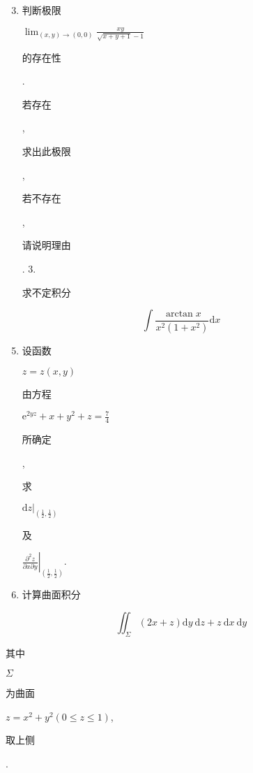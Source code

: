 \documentclass[10pt]{article}
\begin{document}
\begin{enumerate}
  \setcounter{enumi}{2}
  \item \begin{CJK}{UTF8}{mj}判断极限\end{CJK} $\lim _{(x, y) \rightarrow(0,0)} \frac{x y}{\sqrt{x+y+1}-1}$ \begin{CJK}{UTF8}{mj}的存在性\end{CJK}. \begin{CJK}{UTF8}{mj}若存在\end{CJK}, \begin{CJK}{UTF8}{mj}求出此极限\end{CJK}, \begin{CJK}{UTF8}{mj}若不存在\end{CJK}, \begin{CJK}{UTF8}{mj}请说明理由\end{CJK}. 3. \begin{CJK}{UTF8}{mj}求不定积分\end{CJK}
\end{enumerate}
$$
\int \frac{\arctan x}{x^{2}\left(1+x^{2}\right)} \mathrm{d} x
$$

\begin{enumerate}
  \setcounter{enumi}{4}
  \item \begin{CJK}{UTF8}{mj}设函数\end{CJK} $z=z(x, y)$ \begin{CJK}{UTF8}{mj}由方程\end{CJK} $\mathrm{e}^{2 y z}+x+y^{2}+z=\frac{7}{4}$ \begin{CJK}{UTF8}{mj}所确定\end{CJK}, \begin{CJK}{UTF8}{mj}求\end{CJK} $\left.\mathrm{d} z\right|_{\left(\frac{1}{2}, \frac{1}{2}\right)}$ \begin{CJK}{UTF8}{mj}及\end{CJK} $\left.\frac{\partial^{2} z}{\partial x \partial y}\right|_{\left(\frac{1}{2}, \frac{1}{2}\right)}$.

  \item \begin{CJK}{UTF8}{mj}计算曲面积分\end{CJK}

\end{enumerate}
$$
\iint_{\Sigma}(2 x+z) \mathrm{d} y \mathrm{~d} z+z \mathrm{~d} x \mathrm{~d} y
$$
\begin{CJK}{UTF8}{mj}其中\end{CJK} $\Sigma$ \begin{CJK}{UTF8}{mj}为曲面\end{CJK} $z=x^{2}+y^{2}(0 \leq z \leq 1)$, \begin{CJK}{UTF8}{mj}取上侧\end{CJK}.
\end{document}
